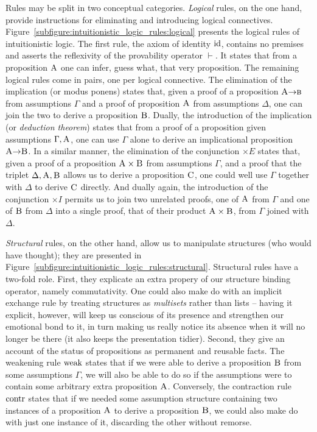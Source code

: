 Rules may be split in two conceptual categories.
\textit{Logical} rules, on the one hand, provide instructions for eliminating and introducing logical connectives.
Figure~\ref{subfigure:intuitionistic_logic_rules:logical} presents the logical rules of intuitionistic logic.
The first rule, the axiom of identity $\mathrm{id}$, contains no premises and asserts the reflexivity of the provability operator $\vdash$. 
It states that from a proposition $\normalfont\textsc{A}$ one can infer, guess what, that very proposition.
The remaining logical rules come in pairs, one per logical connective.
The elimination of the implication (or modus ponens) states that, given a proof of a proposition $\smallprop A \ii \prop{b}$ from assumptions $\Gamma$ and a proof of proposition $\normalfont\textsc{A}$ from assumptions $\Delta$, one can join the two to derive a proposition $\normalfont\textsc{B}$.
Dually, the introduction of the implication (or \textit{deduction theorem}) states that from a proof of a proposition  given assumptions $\Gamma, \normalfont\textsc{A}$, one can use $\Gamma$ alone to derive an implicational proposition $\smallprop A \ii \smallprop B$.
In a similar manner, the elimination of the conjunction $\times E $ states that, given a proof of a proposition $\normalfont\textsc{A} \times \normalfont\textsc{B}$ from assumptions $\Gamma$, and a proof that the triplet $\Delta, \normalfont\textsc{A}, \normalfont\textsc{B}$ allows us to derive a proposition $\normalfont\textsc{C}$, one could well use $\Gamma$ together with $\Delta$ to derive $\prop C$ directly.
And dually again, the introduction of the conjunction $\times I$ permits us to join two unrelated proofs, one of $\normalfont\textsc{A}$ from $\Gamma$ and one of $\normalfont\textsc{B}$ from $\Delta$ into a single proof, that of their product $\normalfont\textsc{A} \times \normalfont\textsc{B}$, from $\Gamma$ joined with $\Delta$.

\textit{Structural} rules, on the other hand, allow us to manipulate structures (who would have thought); they are presented in Figure~\ref{subfigure:intuitionistic_logic_rules:structural}.
Structural rules have a two-fold role.
First, they explicate an extra propery of our structure binding operator, namely commutativity.
One could also make do with an implicit exchange rule by treating structures as \textit{multisets} rather than lists -- having it explicit, however, will keep us conscious of its presence and strengthen our emotional bond to it, in turn making us really notice its absence when it will no longer be there (it also keeps the presentation tidier).
Second, they give an account of the status of propositions as permanent and reusable facts.
The weakening rule $\mathrm{weak}{}$ states that if we were able to derive a proposition $\normalfont\textsc{B}$ from some assumptions $\Gamma$, we will also be able to do so if the assumptions were to contain some arbitrary extra proposition $\normalfont\textsc{A}$.
Conversely, the contraction rule $\mathrm{contr}{}$ states that if we needed some assumption structure containing two instances of a proposition $\normalfont\textsc{A}$ to derive a proposition $\normalfont\textsc{B}$, we could also make do with just one instance of it, discarding the other without remorse.

